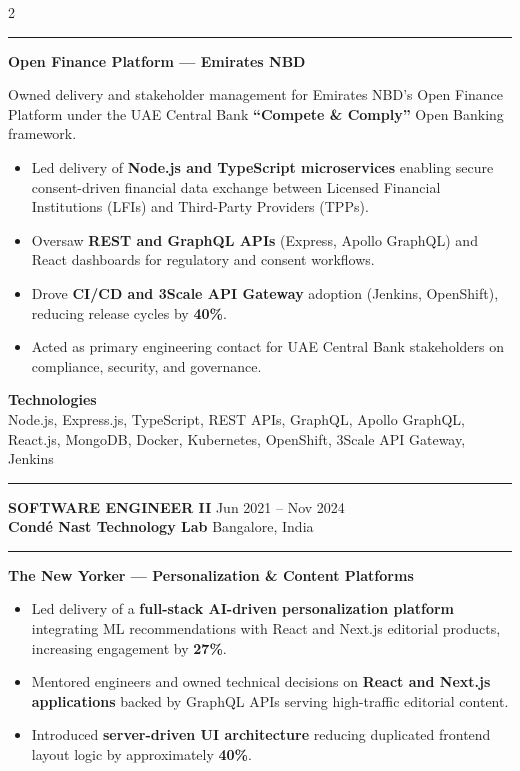 \documentclass[10pt,a4paper]{article}
\newcommand{\blockdivider}{\vspace{0pt}\color{rulecolor}\rule{\linewidth}{0.5pt}\color{primary}\vspace{4pt}}
\newcommand{\roleheader}[4]{%
  \noindent
  \textbf{\MakeUppercase{#3}}%
  \hfill
  \textcolor{secondary}{#4}\\[0pt]

  \noindent
  \textbf{#1}%
  \hfill
  \textcolor{secondary}{#2}\\[0pt]
}
\newcommand{\roledivider}{%
  \vspace{-1pt}%
  {\color{rulecolor}\rule{\linewidth}{0.5pt}}%
  \vspace{2pt}%
}
\newcommand{\projecttitle}[1]{\textbf{#1}\par\vspace{2pt}}
\begin{document}
\begin{paracol}{2}
\blockdivider

\projecttitle{Open Finance Platform — Emirates NBD}

Owned delivery and stakeholder management for Emirates NBD's Open Finance Platform under the UAE Central Bank \textbf{``Compete \& Comply''} Open Banking framework.

\begin{itemize}

\item Led delivery of \textbf{Node.js and TypeScript microservices} enabling secure consent-driven financial data exchange between Licensed Financial Institutions (LFIs) and Third-Party Providers (TPPs).

\item Oversaw \textbf{REST and GraphQL APIs} (Express, Apollo GraphQL) and React dashboards for regulatory and consent workflows.

\item Drove \textbf{CI/CD and 3Scale API Gateway} adoption (Jenkins, OpenShift), reducing release cycles by \textbf{40\%}.

\item Acted as primary engineering contact for UAE Central Bank stakeholders on compliance, security, and governance.

\end{itemize}

\textbf{Technologies}\\
Node.js, Express.js, TypeScript, REST APIs, GraphQL, Apollo GraphQL, React.js, MongoDB, Docker, Kubernetes, OpenShift, 3Scale API Gateway, Jenkins

\blockdivider


\roleheader{Cond\'e Nast Technology Lab}{Bangalore, India}{Software Engineer II}{Jun 2021 -- Nov 2024}
\roledivider
\projecttitle{ The New Yorker — Personalization \& Content Platforms}

\begin{itemize}

\item Led delivery of a \textbf{full-stack AI-driven personalization platform} integrating ML recommendations with React and Next.js editorial products, increasing engagement by \textbf{27\%}.

\item Mentored engineers and owned technical decisions on \textbf{React and Next.js applications} backed by GraphQL APIs serving high-traffic editorial content.

\item Introduced \textbf{server-driven UI architecture} reducing duplicated frontend layout logic by approximately \textbf{40\%}.


\end{itemize}
\end{paracol}
\end{document}
